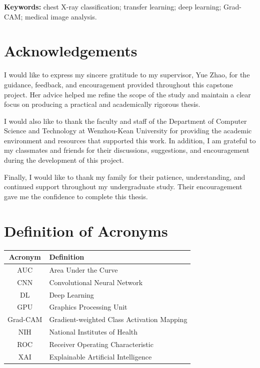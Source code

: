 \documentclass[12pt, oneside]{book}
\begin{document}
\textbf{Keywords:} chest X-ray classification; transfer learning; deep learning; Grad-CAM; medical image analysis.

\chapter*{Acknowledgements}
I would like to express my sincere gratitude to my supervisor, Yue Zhao, for the guidance, feedback, and encouragement provided throughout this capstone project. Her advice helped me refine the scope of the study and maintain a clear focus on producing a practical and academically rigorous thesis.

I would also like to thank the faculty and staff of the Department of Computer Science and Technology at Wenzhou-Kean University for providing the academic environment and resources that supported this work. In addition, I am grateful to my classmates and friends for their discussions, suggestions, and encouragement during the development of this project.

Finally, I would like to thank my family for their patience, understanding, and continued support throughout my undergraduate study. Their encouragement gave me the confidence to complete this thesis.

\clearpage
\tableofcontents

\cleardoublepage
{}
\listoffigures

\cleardoublepage
{}
\listoftables

\chapter*{Definition of Acronyms}
\begin{flushleft}
    \begin{tabular}{|c|l|}
    \hline
    \textbf{Acronym} & \textbf{Definition} \\
    \hline
    AUC & Area Under the Curve \\
    CNN & Convolutional Neural Network \\
    DL & Deep Learning \\
    GPU & Graphics Processing Unit \\
    Grad-CAM & Gradient-weighted Class Activation Mapping \\
    NIH & National Institutes of Health \\
    ROC & Receiver Operating Characteristic \\
    XAI & Explainable Artificial Intelligence \\
    \hline
    \end{tabular}
\end{flushleft}
\end{document}
